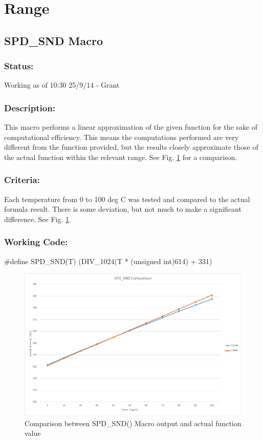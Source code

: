 \documentclass[]{article}
\begin{document}
\newpage
\section{Range}

\subsection{SPD\_SND Macro}
\subsubsection{Status:}
Working as of 10:30 25/9/14 - Grant

\subsubsection{Description:}
This macro performs a linear approximation of the given function for the sake of computational efficiency. This means the computations performed are very different from the function provided, but the results closely approximate those of the actual function within the relevant range. See Fig. \ref{fig:SND_comp} for a comparison.

\subsubsection{Criteria:}
Each temperature from 0 to 100 deg C was tested and compared to the actual formula result. There is some deviation, but not much to make a significant difference. See Fig. \ref{fig:SND_comp}.\newline 

\subsubsection{Working Code:}
\#define SPD\_SND(T) (DIV\_1024(T * (unsigned int)614) + 331)

\begin{figure}
	\centering
	\includegraphics[width=0.7\linewidth]{SND_comp}
	\caption{Comparison between SPD\_SND() Macro output and actual function value}
	\label{fig:SND_comp}
\end{figure}
\end{document}
